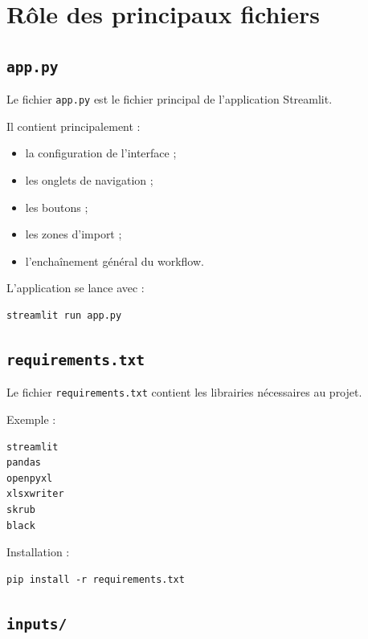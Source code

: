 \documentclass[11pt,a4paper]{article}
\begin{document}
\section{Rôle des principaux fichiers}

\subsection{\texttt{app.py}}

Le fichier \texttt{app.py} est le fichier principal de l'application Streamlit.

Il contient principalement :

\begin{itemize}
    \item la configuration de l'interface ;
    \item les onglets de navigation ;
    \item les boutons ;
    \item les zones d'import ;
    \item l'enchaînement général du workflow.
\end{itemize}

L'application se lance avec :

\begin{lstlisting}
streamlit run app.py
\end{lstlisting}

\subsection{\texttt{requirements.txt}}

Le fichier \texttt{requirements.txt} contient les librairies nécessaires au projet.

Exemple :

\begin{lstlisting}
streamlit
pandas
openpyxl
xlsxwriter
skrub
black
\end{lstlisting}

Installation :

\begin{lstlisting}
pip install -r requirements.txt
\end{lstlisting}

\subsection{\texttt{inputs/}}
\end{document}
